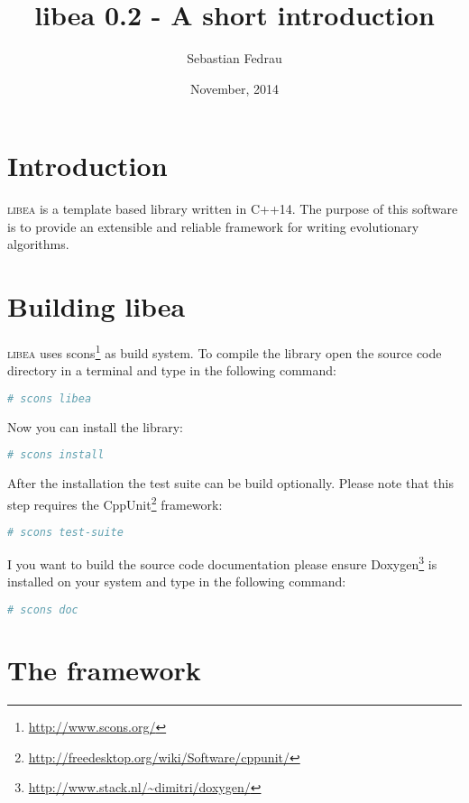 \documentclass[a4paper]{article}
\title{libea 0.2 - A short introduction}
\author{Sebastian Fedrau}
\date{November, 2014}
\begin{document}
\maketitle

\newpage

\section{Introduction}

\textsc{libea} is a template based library written in C++14. The purpose of this software is to provide an extensible and reliable framework for writing evolutionary algorithms.

\section{Building libea}

\textsc{libea} uses scons\footnote{\url{http://www.scons.org/}} as build system. To compile the library open the source code directory in a terminal and type in the following command:

\begin{lstlisting}[language=bash, numbers=none]
# scons libea
\end{lstlisting}

Now you can install the library:

\begin{lstlisting}[language=bash, numbers=none]
# scons install
\end{lstlisting}

After the installation the test suite can be build optionally. Please note that this step requires the CppUnit\footnote{\url{http://freedesktop.org/wiki/Software/cppunit/}} framework:

\begin{lstlisting}[language=bash, numbers=none]
# scons test-suite
\end{lstlisting}

I you want to build the source code documentation please ensure Doxygen\footnote{\url{http://www.stack.nl/~dimitri/doxygen/}} is installed on your system and type in the following command:

\begin{lstlisting}[language=bash, numbers=none]
# scons doc
\end{lstlisting}

\section{The framework}
\end{document}
